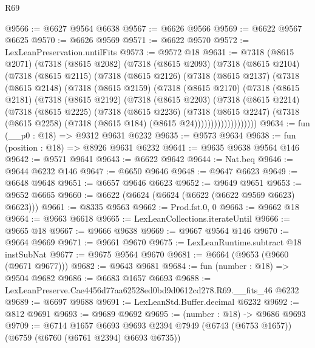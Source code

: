 \begin{lexlean}{R69}
\begin{coremodule}
{@9566 := @6627 @9564 @6638
@9567 := @6626 @9566
@9569 := @6622 @9567 @6625
@9570 := @6626 @9569
@9571 := @6622 @9570
@9572 := LexLeanPreservation.untilFits
@9573 := @9572 @18
@9631 := @7318
    (@8615 @2071)
    (@7318
      (@8615 @2082)
      (@7318
        (@8615 @2093)
        (@7318
          (@8615 @2104)
          (@7318
            (@8615 @2115)
            (@7318
              (@8615 @2126)
              (@7318
                (@8615 @2137)
                (@7318
                  (@8615 @2148)
                  (@7318
                    (@8615 @2159)
                    (@7318
                      (@8615 @2170)
                      (@7318
                        (@8615 @2181)
                        (@7318
                          (@8615 @2192)
                          (@7318
                            (@8615 @2203)
                            (@7318
                              (@8615 @2214)
                              (@7318
                                (@8615 @2225)
                                (@7318
                                  (@8615 @2236)
                                  (@7318
                                    (@8615 @2247)
                                    (@7318
                                      (@8615 @2258)
                                      (@7318 (@8615 @184) (@8615 @24)))))))))))))))))))
@9634 := fun (__p0 : @18) => @9312 @9631 @6232
@9635 := @9573 @9634
@9638 := fun (position : @18) => @8926 @9631 @6232
@9641 := @9635 @9638 @9564 @146
@9642 := @9571 @9641
@9643 := @6622 @9642
@9644 := Nat.beq
@9646 := @9644 @6232 @146
@9647 := @6650 @9646
@9648 := @9647 @6623
@9649 := @6648 @9648
@9651 := @6657 @9646 @6623
@9652 := @9649 @9651
@9653 := @9652 @6665
@9660 := @6622 (@6624 (@6624 (@6622 (@6622 @9569 @6623) @6623)))
@9661 := @8335 @9563
@9662 := Prod.fst.{0, 0}
@9663 := @9662 @18
@9664 := @9663 @6618
@9665 := LexLeanCollections.iterateUntil
@9666 := @9665 @18
@9667 := @9666 @9638
@9669 := @9667 @9564 @146
@9670 := @9664 @9669
@9671 := @9661 @9670
@9675 := LexLeanRuntime.subtract @18 instSubNat
@9677 := @9675 @9564 @9670
@9681 := @6664 (@9653 (@9660 (@9671 @9677)))
@9682 := @9643 @9681
@9684 := fun (number : @18) => @9504 @9682
@9686 := @6683 @1657 @6693
@9688 := LexLeanPreserve.Cae4456d77aa62528ed0bd9d0612cd278.R69.__fits_46 @6232
@9689 := @6697 @9688
@9691 := LexLeanStd.Buffer.decimal @6232
@9692 := @812 @9691
@9693 := @9689 @9692
@9695 := (number : @18) -> @9686 @9693
@9709 := @6714
    @1657
    @6693
    @9693
    @2394
    @7949
    (@6743 (@6753 @1657))
    (@6759 (@6760 (@6761 @2394) @6693 @6735))
}
\end{coremodule}
\end{lexlean}
